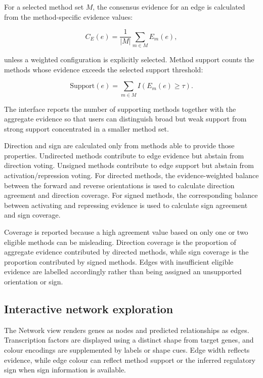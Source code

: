 \documentclass[unnumsec,webpdf,modern,large]{oup-authoring-template}%
\begin{document}
For a selected method set $M$, the consensus evidence for an edge is calculated from the method-specific evidence values:

\begin{equation}
C_E(e)=\frac{1}{|M|}\sum_{m\in M}E_m(e),
\end{equation}

unless a weighted configuration is explicitly selected. Method support counts the methods whose evidence exceeds the selected support threshold:

\begin{equation}
\mathrm{Support}(e)=\sum_{m\in M}I(E_m(e)\geq\tau).
\end{equation}

The interface reports the number of supporting methods together with the aggregate evidence so that users can distinguish broad but weak support from strong support concentrated in a smaller method set.

Direction and sign are calculated only from methods able to provide those properties. Undirected methods contribute to edge evidence but abstain from direction voting. Unsigned methods contribute to edge support but abstain from activation/repression voting. For directed methods, the evidence-weighted balance between the forward and reverse orientations is used to calculate direction agreement and direction coverage. For signed methods, the corresponding balance between activating and repressing evidence is used to calculate sign agreement and sign coverage.

Coverage is reported because a high agreement value based on only one or two eligible methods can be misleading. Direction coverage is the proportion of aggregate evidence contributed by directed methods, while sign coverage is the proportion contributed by signed methods. Edges with insufficient eligible evidence are labelled accordingly rather than being assigned an unsupported orientation or sign.

\subsection{Interactive network exploration}

The Network view renders genes as nodes and predicted relationships as edges. Transcription factors are displayed using a distinct shape from target genes, and colour encodings are supplemented by labels or shape cues. Edge width reflects evidence, while edge colour can reflect method support or the inferred regulatory sign when sign information is available.
\end{document}
